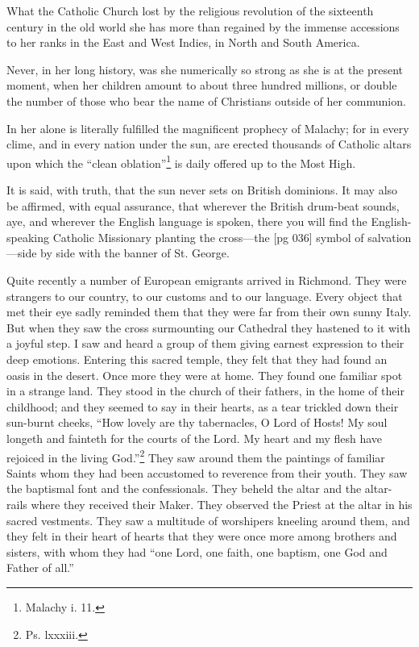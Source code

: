 What the Catholic Church lost by the religious
revolution of the sixteenth century in the old
world she has more than regained by the immense
accessions to her ranks in the East and West
Indies, in North and South America.

Never, in her long history, was she numerically
so strong as she is at the present moment, when her
children amount to about three hundred millions,
or double the number of those who bear the name
of Christians outside of her communion.

In her alone is literally fulfilled the magnificent
prophecy of Malachy; for in every clime, and in
every nation under the sun, are erected thousands
of Catholic altars upon which the “clean oblation”\footnote{Malachy
i. 11.} is daily offered up to the Most High.

It is said, with truth, that the sun never sets on
British dominions. It may also be affirmed, with
equal assurance, that wherever the British drum-beat
sounds, aye, and wherever the English language
is spoken, there you will find the English-speaking
Catholic Missionary planting the cross—the
[pg 036]
symbol of salvation—side by side with the
banner of St. George.

Quite recently a number of European emigrants
arrived in Richmond. They were strangers to our
country, to our customs and to our language.
Every object that met their eye sadly reminded
them that they were far from their own sunny
Italy. But when they saw the cross surmounting
our Cathedral they hastened to it with a joyful
step. I saw and heard a group of them giving
earnest expression to their deep emotions. Entering
this sacred temple, they felt that they had
found an oasis in the desert. Once more they were
at home. They found one familiar spot in a
strange land. They stood in the church of their
fathers, in the home of their childhood; and they
seemed to say in their hearts, as a tear trickled
down their sun-burnt cheeks, “How lovely are
thy tabernacles, O Lord of Hosts! My soul longeth
and fainteth for the courts of the Lord. My
heart and my flesh have rejoiced in the living
God.”\footnote{Ps.
lxxxiii.} They saw around them the paintings of
familiar Saints whom they had been accustomed
to reverence from their youth. They saw the
baptismal font and the confessionals. They beheld
the altar and the altar-rails where they received
their Maker. They observed the Priest
at the altar in his sacred vestments. They saw
a multitude of worshipers kneeling around them,
and they felt in their heart of hearts that they
were once more among brothers and sisters, with
whom they had “one Lord, one faith, one baptism,
one God and Father of all.”

